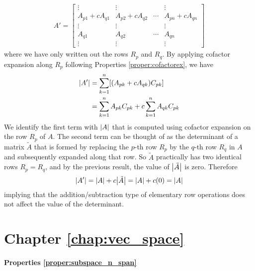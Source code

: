 \begin{align*}
A' = 
\begin{bmatrix}
\vdots & \vdots & & \vdots\\
A_{p1} + cA_{q1} & A_{p2} + cA_{q2} & \cdots & A_{pn} + cA_{qn} \\
\vdots & \vdots & & \vdots\\
A_{q1} & A_{q2} & \cdots & A_{qn} \\
\vdots & \vdots & & \vdots
\end{bmatrix}
\end{align*}
where we have only written out the rows $R_p$ and $R_q$. By applying cofactor expansion along $R_p$ following Properties \ref{proper:cofactorex}, we have
\begin{align}
\abs{A'} &= \sum_{k=1}^{n} [(A_{pk} + cA_{qk}) C_{pk}] \nonumber \\
&= \sum_{k=1}^{n} A_{pk}C_{pk} + c\sum_{k=1}^{n} A_{qk}C_{pk}
\end{align}
We identify the first term with $\abs{A}$ that is computed using cofactor expansion on the row $R_p$ of $A$. The second term can be thought of as the determinant of a matrix $\tilde{A}$ that is formed by replacing the $p$-th row $R_p$ by the $q$-th row $R_q$ in $A$ and subsequently expanded along that row. So $\tilde{A}$ practically has two identical rows $R_p = R_q$, and by the previous result, the value of $\abs{\tilde{A}}$ is zero. Therefore
\begin{align}
\abs{A'} = \abs{A} + c\abs{\tilde{A}} = \abs{A} + c(0) = \abs{A}    
\end{align} implying that the addition/subtraction type of elementary row operations does not affect the value of the determinant.

\section{Chapter \ref*{chap:vec_space}}
\label{section:vecspaceappend}

\paragraph{Properties \ref*{proper:subspace_n_span}}  

